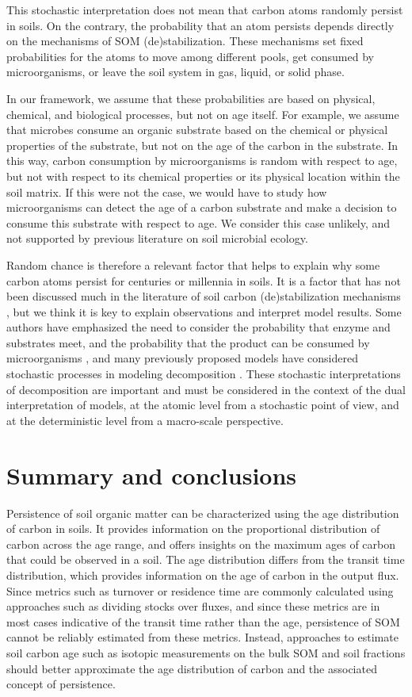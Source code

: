 \documentclass[draft,linenumbers]{agujournal}
\begin{document}
This stochastic interpretation does not mean that carbon atoms randomly persist in soils. On the contrary, the probability that an atom persists depends directly on the mechanisms of SOM (de)stabilization. These mechanisms set fixed probabilities for the atoms to move among different pools, get consumed by microorganisms, or leave the soil system in gas, liquid, or solid phase. 

In our framework, we assume that these probabilities are based on physical, chemical, and biological processes, but not on age itself. For example, we assume that microbes consume an organic substrate based on the chemical or physical properties of the substrate, but not on the age of the carbon in the substrate. In this way, carbon consumption by microorganisms is random with respect to age, but not with respect to its chemical properties or its physical location within the soil matrix.  If this were not the case, we would have to study how microorganisms can detect the age of a carbon substrate and make a decision to consume this substrate with respect to age. We consider this case unlikely, and not supported by previous literature on soil microbial ecology.

Random chance is therefore a relevant factor that helps to explain why some carbon atoms persist for centuries or millennia in soils. It is a factor that has not been discussed much in the literature of soil carbon (de)stabilization mechanisms \citep{Schmidt2011, Dungait2012, LehmannKleber}, but we think it is key to explain observations and interpret model results. Some authors have emphasized the need to consider the probability that enzyme and substrates meet, and the probability that the product can be consumed by microorganisms \citep{Don2013, Gleixner2013, Spohn2014}, and many previously proposed models have considered stochastic processes in modeling decomposition \citep{Manzoni2009SBB}. These stochastic interpretations of decomposition are important and must be considered in the context of the dual interpretation of models, at the atomic level from a stochastic point of view, and at the deterministic level from a macro-scale perspective. 


\section{Summary and conclusions}
Persistence of soil organic matter can be characterized using the age distribution of carbon in soils. It provides information on the proportional distribution of carbon across the age range, and offers insights on the maximum ages of carbon that could be observed in a soil. The age distribution differs from the transit time distribution, which provides information on the age of carbon in the output flux. Since metrics such as turnover or residence time are commonly calculated using approaches such as dividing stocks over fluxes, and since these metrics are in most cases indicative of the transit time rather than the age, persistence of SOM cannot be reliably estimated from these metrics. Instead, approaches to estimate soil carbon age such as isotopic measurements on the bulk SOM and soil fractions should better approximate the age distribution of carbon and the associated concept of persistence. 
\end{document}
